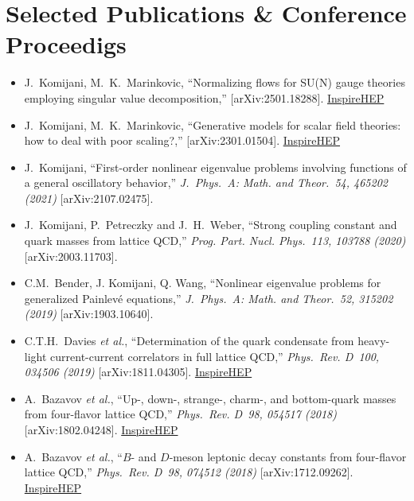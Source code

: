 \documentclass[a4paper,10pt]{article}
\begin{document}
\section*{Selected Publications \& Conference Proceedigs}

\begin{itemize}
\item J.~Komijani, M.~K.~Marinkovic, ``Normalizing flows for SU(N) gauge theories employing singular value decomposition,'' [arXiv:2501.18288]. \href{https://inspirehep.net/literature/2874143}{InspireHEP}

\item J.~Komijani, M.~K.~Marinkovic, ``Generative models for scalar field theories: how to deal with poor scaling?,'' [arXiv:2301.01504]. \href{https://inspirehep.net/literature/2620105}{InspireHEP}

\item J.~Komijani, ``First-order nonlinear eigenvalue problems involving functions of a general oscillatory behavior,'' \textit{J.~Phys.~A: Math. and Theor.~54, 465202 (2021)} [arXiv:2107.02475].

\item J.~Komijani, P.~Petreczky and J.~H.~Weber, ``Strong coupling constant and quark masses from lattice QCD,'' \textit{Prog. Part. Nucl. Phys.~113, 103788 (2020)} [arXiv:2003.11703].

\item C.M.~Bender, J. Komijani, Q. Wang, ``Nonlinear eigenvalue problems for generalized Painlev\'e equations,'' \textit{J.~Phys.~A: Math. and Theor.~52, 315202 (2019)} [arXiv:1903.10640].

\item C.T.H.~Davies \textit{et al.}, ``Determination of the quark condensate from heavy-light current-current correlators in full lattice QCD,'' \textit{Phys.~Rev. D~100, 034506 (2019)} [arXiv:1811.04305]. \href{http://inspirehep.net/record/1703119}{InspireHEP}

\item A.~Bazavov \textit{et al.}, ``Up-, down-, strange-, charm-, and bottom-quark masses from four-flavor lattice QCD,'' \textit{Phys.~Rev. D~98, 054517 (2018)} [arXiv:1802.04248]. \href{http://inspirehep.net/record/1654552}{InspireHEP}

\item A.~Bazavov \textit{et al.}, ``$B$- and $D$-meson leptonic decay constants from four-flavor lattice QCD,'' \textit{Phys.~Rev. D~98, 074512 (2018)} [arXiv:1712.09262]. \href{http://inspirehep.net/record/1644910}{InspireHEP}


\end{itemize}
\end{document}
